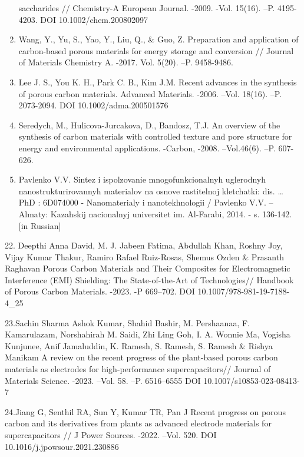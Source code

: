 \begin{enumerate}
  saccharides // Chemistry-A European Journal. -2009. -Vol. 15(16). --P.
  4195-4203. DOI 10.1002/chem.200802097
\item
  Wang, Y., Yu, S., Yao, Y., Liu, Q., \& Guo, Z. Preparation and
  application of carbon-based porous materials for energy storage and
  conversion // Journal of Materials Chemistry A. -2017. Vol. 5(20).
  --P. 9458-9486.
\item
  Lee J. S., You K. H., Park C. B., Kim J.M. Recent advances in the
  synthesis of porous carbon materials. Advanced Materials. -2006.
  --Vol. 18(16). --P. 2073-2094. DOI 10.1002/adma.200501576
\item
  Seredych, M., Hulicova-Jurcakova, D., Bandosz, T.J. An overview of the
  synthesis of carbon materials with controlled texture and pore
  structure for energy and environmental applications. -Carbon, -2008.
  --Vol.46(6). --P. 607-626.
\item
  Pavlenko V.V. Sintez i ispol\textquotesingle zovanie
  mnogofunkcional\textquotesingle nyh uglerodnyh nanostrukturirovannyh
  materialov na osnove rastitel\textquotesingle noj kletchatki: dis.
  \ldots{} PhD : 6D074000 - Nanomaterialy i nanotekhnologii / Pavlenko
  V.V. -- Almaty: Kazahskij nacional\textquotesingle nyj universitet im.
  Al\textquotesingle-Farabi, 2014. - s. 136-142. {[}in Russian{]}
\end{enumerate}

22. Deepthi Anna David, M. J. Jabeen Fatima, Abdullah Khan, Roshny Joy,
Vijay Kumar Thakur, Ramiro Rafael Ruiz-Rosas, Shemus Ozden \& Prasanth
Raghavan Porous Carbon Materials and Their Composites for
Electromagnetic Interference (EMI) Shielding: The State-of-the-Art of
Technologies// Handbook of Porous Carbon Materials. -2023. -P 669--702.
DOI 10.1007/978-981-19-7188-4\_25

23.Sachin Sharma Ashok Kumar, Shahid Bashir, M. Pershaanaa, F.
Kamarulazam, Norshahirah M. Saidi, Zhi Ling Goh, I. A. Wonnie Ma,
Vogisha Kunjunee, Anif Jamaluddin, K. Ramesh, S. Ramesh, S. Ramesh \&
Rishya Manikam A review on the recent progress of the plant-based porous
carbon materials as electrodes for high-performance supercapacitors//
Journal of Materials Science. -2023. --Vol. 58. --P. 6516--6555 DOI
10.1007/s10853-023-08413-7

24.Jiang G, Senthil RA, Sun Y, Kumar TR, Pan J Recent progress on porous
carbon and its derivatives from plants as advanced electrode materials
for supercapacitors // J Power Sources. -2022. --Vol. 520. DOI
10.1016/j.jpowsour.2021.230886

